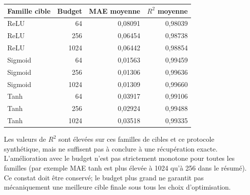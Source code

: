 \documentclass[11pt,a4paper,oneside]{report}
\begin{document}
\begin{center}
\begin{tabular}{lrrr}
\toprule
Famille cible & Budget & MAE moyenne & \(R^2\) moyenne\\
\midrule
ReLU & 64 & 0,08091 & 0,98039\\
ReLU & 256 & 0,06454 & 0,98738\\
ReLU & 1024 & 0,06442 & 0,98854\\
Sigmoid & 64 & 0,01563 & 0,99459\\
Sigmoid & 256 & 0,01306 & 0,99636\\
Sigmoid & 1024 & 0,01309 & 0,99660\\
Tanh & 64 & 0,03917 & 0,99106\\
Tanh & 256 & 0,02924 & 0,99488\\
Tanh & 1024 & 0,03518 & 0,99335\\
\bottomrule
\end{tabular}
\end{center}
Les valeurs de \(R^2\) sont élevées sur ces familles de cibles et ce protocole synthétique, mais ne suffisent pas à conclure à une récupération exacte. L'amélioration avec le budget n'est pas strictement monotone pour toutes les familles (par exemple MAE tanh est plus élevée à 1024 qu'à 256 dans le résumé). Ce constat doit être conservé; le budget plus grand ne garantit pas mécaniquement une meilleure cible finale sous tous les choix d'optimisation.
\end{document}
